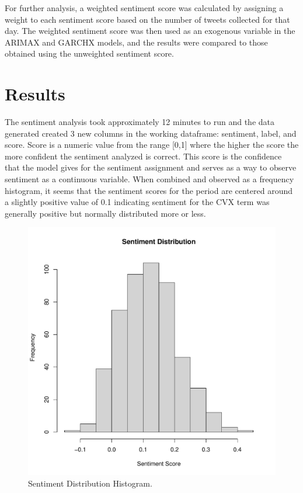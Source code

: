 \documentclass[12pt, letterpaper, titlepage]{article}
\begin{document}
For further analysis, a weighted sentiment score was calculated by assigning a weight to each sentiment score based on the number of tweets collected for that day. The weighted sentiment score was then used as an exogenous variable in the ARIMAX and GARCHX models, and the results were compared to those obtained using the unweighted sentiment score.

\label{sec: results}
\section{Results}

The sentiment analysis took approximately 12 minutes to run and the data generated created 3 new columns in the working dataframe: sentiment, label, and score. Score is a numeric value from the range [0,1] where the higher the score the more confident the sentiment analyzed is correct. This score is the confidence that the model gives for the sentiment assignment and serves as a way to observe sentiment as a continuous variable. When combined and observed as a frequency histogram, it seems that the sentiment scores for the period are centered around a slightly positive value of 0.1 indicating sentiment for the CVX term was generally positive but normally distributed more or less.


\begin{figure}[tbp]
  \begin{center}
  \includegraphics[width=\textwidth]{../figures/fig3.pdf}
  \caption{Sentiment Distribution Histogram.}\label{fig:sentimenthist}
  \end{center}
\end{figure}
\end{document}
